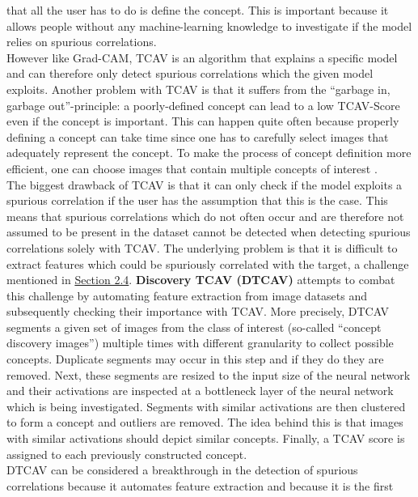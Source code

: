\documentclass{article}
\begin{document}
that all the user has to do is define the concept. This is important because it allows people without any machine-learning
knowledge to investigate if the model relies on spurious correlations. \\
However like Grad-CAM, TCAV is an algorithm that explains a specific model and can
therefore only detect spurious correlations which the given model exploits. Another problem with TCAV
is that it suffers from the \enquote{garbage in, garbage out}-principle: a poorly-defined concept can lead to a low
TCAV-Score even if the concept is important. This can happen quite often because properly defining a concept can take time
since one has to carefully select images that adequately represent the concept. To make the process of concept definition
more efficient, one can choose images that contain multiple concepts of interest \cite{tong2020investigating}. \\ 
The biggest drawback of TCAV is that it can only check if the model exploits a spurious correlation if the user has the assumption 
that this is the case. This means that spurious correlations which do not often occur and are therefore not assumed 
to be present in the dataset cannot be detected when detecting spurious correlations solely with TCAV. The underlying problem is
that it is difficult to extract features which could be spuriously correlated with the target, a challenge mentioned in
\hyperref[sec:challenges]{Section 2.4}. \textbf{Discovery TCAV (DTCAV)} \cite{ghorbani2019automating} attempts to combat this challenge by
automating feature extraction from image datasets and subsequently checking their importance with TCAV. More precisely, DTCAV segments a
given set of images from the class of interest (so-called \enquote{concept discovery images}) multiple times with different granularity to
collect possible concepts. Duplicate segments may occur in this step and if they do they are removed. Next, these segments are
resized to the input size of the neural network and their activations are inspected at a bottleneck layer of the neural network which is being
investigated. Segments with similar activations are then clustered to form a concept and outliers are removed. The idea behind this is that images
with similar activations should depict similar concepts. Finally, a TCAV score is assigned to each previously constructed concept. \\
\newpage
DTCAV can be considered a breakthrough in the detection of spurious correlations because it automates feature extraction and because it is the first
\end{document}
